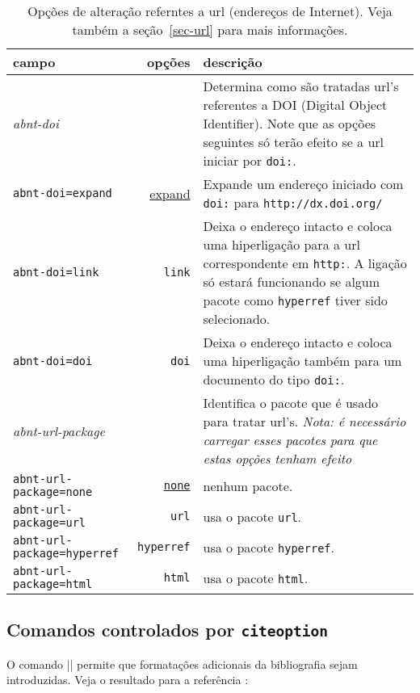 \documentclass[a4paper]{ltxdoc}
\begin{document}
\begin{table}[htbp]

\caption[Opções de alteração dos estilos bibliográficos: url]{
Opções de alteração referntes a url (endereços de Internet).
Veja também a seção~\protect\ref{sec-url} para mais informações.}
\label{tabela-opcoes-url}

\begin{center}
\begin{tabular}{lrp{6cm}}\hline\hline
campo & opções & descrição \\ \hline
\emph{abnt-doi} & & Determina como são tratadas url's referentes a DOI
(Digital Object Identifier)\cite{DOI}. Note que as opções seguintes
só terão efeito se a url iniciar por {\tt doi:}.\\
{\tt abnt-doi=expand} & \underline{expand} &
Expande um endereço iniciado com {\tt doi:} para
{\tt http://dx.doi.org/}\\
{\tt abnt-doi=link} & {\tt link} & Deixa o endereço intacto e coloca uma hiperligação
para a url correspondente em {\tt http:}. A ligação só estará funcionando
se algum pacote como {\tt hyperref} tiver sido selecionado.\\
{\tt abnt-doi=doi} & {\tt doi} & Deixa o endereço intacto e coloca uma hiperligação
também para um documento do tipo {\tt doi:}.\\ \hline
\emph{abnt-url-package} & & Identifica o pacote que é usado para tratar url's.
\emph{Nota: é necessário carregar esses pacotes para que estas opções tenham
efeito}\\
{\tt abnt-url-package=none} &\underline{\tt none} & nenhum pacote.\\
{\tt abnt-url-package=url} & {\tt url} & usa o pacote {\tt url}.\\
{\tt abnt-url-package=hyperref} & {\tt hyperref} & usa o pacote {\tt hyperref}.\\
{\tt abnt-url-package=html} & {\tt html} & usa o pacote {\tt html}.\\
\hline\hline
\end{tabular}
\end{center}
\end{table}

\subsection{Comandos controlados por {\tt citeoption}}

\DescribeMacro{\bibtextitlecommand}
\label{sec-titlecommand}
O comando |\bibtextitlecommand|
permite que formatações adicionais da bibliografia sejam introduzidas. Veja o
resultado para a referência :
\end{document}
